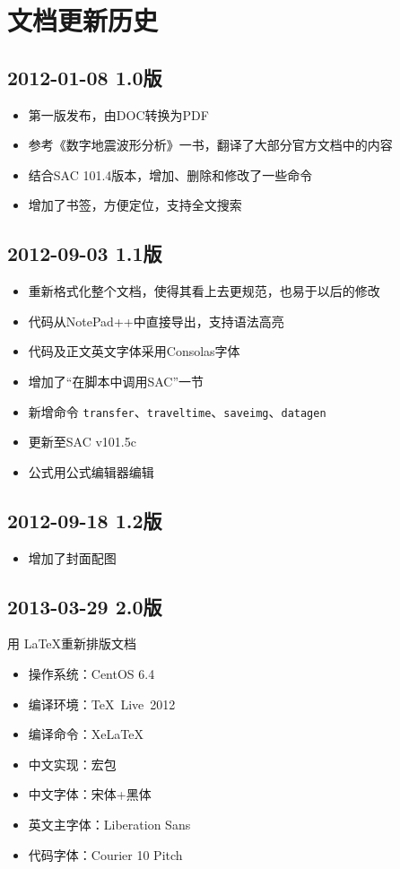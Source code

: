 \section{文档更新历史}
\subsection*{2012-01-08 1.0版}
\begin{itemize}
\item 第一版发布，由DOC转换为PDF
\item 参考《数字地震波形分析》一书，翻译了大部分官方文档中的内容
\item 结合SAC 101.4版本，增加、删除和修改了一些命令
\item 增加了书签，方便定位，支持全文搜索
\end{itemize}

\subsection*{2012-09-03 1.1版}
\begin{itemize}
\item 重新格式化整个文档，使得其看上去更规范，也易于以后的修改
\item 代码从NotePad++中直接导出，支持语法高亮
\item 代码及正文英文字体采用Consolas字体
\item 增加了``在脚本中调用SAC''一节
\item 新增命令 \texttt{transfer}、\texttt{traveltime}、\texttt{saveimg}、\texttt{datagen}
\item 更新至SAC v101.5c
\item 公式用公式编辑器编辑
\end{itemize}

\subsection*{2012-09-18 1.2版}
\begin{itemize}
\item 增加了封面配图
\end{itemize}

\subsection*{2013-03-29 2.0版}
用 \LaTeX 重新排版文档
\begin{itemize}
\item 操作系统：CentOS 6.4
\item 编译环境：\TeX~Live~2012
\item 编译命令：XeLaTeX
\item 中文实现：\CTeX 宏包
\item 中文字体：宋体+黑体
\item 英文主字体：Liberation Sans
\item 代码字体：Courier 10 Pitch
\end{itemize}

